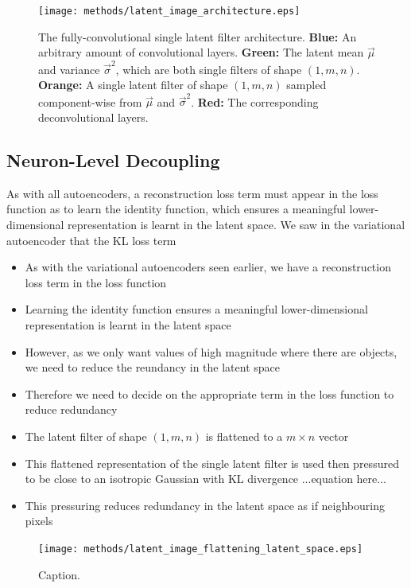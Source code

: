 \begin{figure}[H]
\centering
\captionsetup{justification=centering}
\texttt{[image: methods/latent\_image\_architecture.eps]}
\caption{The fully-convolutional single latent filter architecture. \textbf{Blue:} An arbitrary amount of convolutional layers. \textbf{Green:} The latent mean $\vec{\mu}$ and variance $\vec{\sigma}^2$, which are both single filters of shape $(1, m, n)$. \textbf{Orange:} A single latent filter of shape $(1, m, n)$ sampled component-wise from $\vec{\mu}$ and $\vec{\sigma}^2$. \textbf{Red:} The corresponding deconvolutional layers.}
\label{fig:latent_image_architecture}
\end{figure}

%
%
\subsection{Neuron-Level Decoupling}
As with all autoencoders, a reconstruction loss term must appear in the loss function as to learn the identity function, which ensures a meaningful lower-dimensional representation is learnt in the latent space. We saw in the variational autoencoder that the KL loss term 

\begin{itemize}
\item As with the variational autoencoders seen earlier, we have a reconstruction loss term in the loss function
\item Learning the identity function ensures a meaningful lower-dimensional representation is learnt in the latent space
\item However, as we only want values of high magnitude where there are objects, we need to reduce the reundancy in the latent space
\item Therefore we need to decide on the appropriate term in the loss function to reduce redundancy
\item The latent filter of shape $(1, m, n)$ is flattened to a $m \times n$ vector
\item This flattened representation of the single latent filter is used then pressured to be close to an isotropic Gaussian with KL divergence ...equation here...
\item This pressuring reduces redundancy in the latent space as if neighbouring pixels 
\end{itemize}

\begin{figure}[H]
\centering
\captionsetup{justification=centering}
\texttt{[image: methods/latent\_image\_flattening\_latent\_space.eps]}
\caption{Caption.}
\label{fig:latent_image_flattening_latent_space}
\end{figure}


